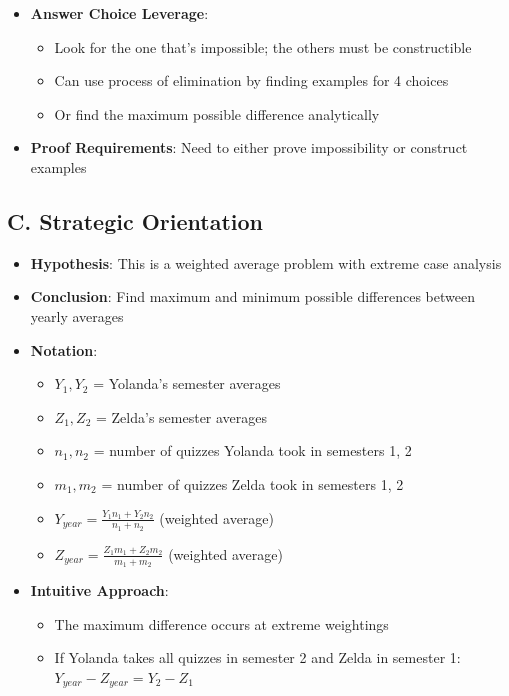 \documentclass[12pt]{article}
\begin{document}
\begin{problemconfigbox}
\begin{itemize}[leftmargin=*]
\begin{itemize}
    \end{itemize}
    \item \textbf{Answer Choice Leverage}: 
    \begin{itemize}
        \item Look for the one that's impossible; the others must be constructible
        \item Can use process of elimination by finding examples for 4 choices
        \item Or find the maximum possible difference analytically
    \end{itemize}
    \item \textbf{Proof Requirements}: Need to either prove impossibility or construct examples
\end{itemize}

\subsection*{C. Strategic Orientation}
\begin{itemize}[leftmargin=*]
    \item \textbf{Hypothesis}: This is a weighted average problem with extreme case analysis
    \item \textbf{Conclusion}: Find maximum and minimum possible differences between yearly averages
    \item \textbf{Notation}: 
    \begin{itemize}
        \item $Y_1, Y_2$ = Yolanda's semester averages
        \item $Z_1, Z_2$ = Zelda's semester averages
        \item $n_1, n_2$ = number of quizzes Yolanda took in semesters 1, 2
        \item $m_1, m_2$ = number of quizzes Zelda took in semesters 1, 2
        \item $Y_{year} = \frac{Y_1 n_1 + Y_2 n_2}{n_1 + n_2}$ (weighted average)
        \item $Z_{year} = \frac{Z_1 m_1 + Z_2 m_2}{m_1 + m_2}$ (weighted average)
    \end{itemize}
    \item \textbf{Intuitive Approach}: 
    \begin{itemize}
        \item The maximum difference occurs at extreme weightings
        \item If Yolanda takes all quizzes in semester 2 and Zelda in semester 1: $Y_{year} - Z_{year} = Y_2 - Z_1$

\end{itemize}
\end{itemize}
\end{problemconfigbox}
\end{document}
